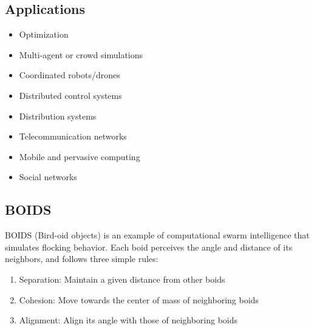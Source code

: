 \subsection*{Applications}
\begin{itemize}
    \item  Optimization
    \item Multi-agent or crowd simulations
    \item Coordinated robots/drones
    \item Distributed control systems
     \item Distribution systems
    \item Telecommunication networks
    \item Mobile and pervasive computing
    \item Social networks
\end{itemize}

\subsection*{BOIDS}
BOIDS (Bird-oid objects) is an example of computational swarm intelligence that simulates flocking behavior. Each boid perceives the angle and distance of its neighbors, and follows three simple rules:
\begin{enumerate}
    \item Separation: Maintain a given distance from other boids
    \item Cohesion: Move towards the center of mass of neighboring boids
    \item Alignment: Align its angle with those of neighboring boids
\end{enumerate}

